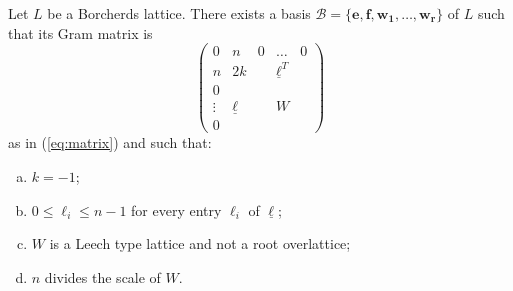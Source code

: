 \documentclass[11pt,letterpaper]{amsart}
\newcommand{\vect}[1]{\boldsymbol{#1}}
\begin{document}
\begin{proposition} \label{prop:Gram.matrix.Borcherds.lattices}
Let $L$ be a Borcherds lattice. There exists a basis $\mathcal{B}=\{\vect{e},\vect{f},\vect{w_1},\ldots,\vect{w_r}\}$ of $L$ such that its Gram matrix is 
\begin{equation*}
\left(\begin{array}{cc|ccc}
0 &n &0 &\ldots &0\\
n &2k & &\underline{\ell}^T &\\
\hline
0 & & & &\\
\vdots &\underline{\ell} & &W &\\
0 & & & &
\end{array}\right)
\end{equation*}
as in (\ref{eq:matrix}) and such that:
\begin{enumerate}[(a)]
    \item $k=-1$;
    \item $0\le \ell_i \le n-1$ for every entry $\ell_i$ of $\underline{\ell}$;
    \item $W$ is a Leech type lattice and not a root overlattice;
    \item $n$ divides the scale of $W$.
\end{enumerate}
\end{proposition}
\end{document}
